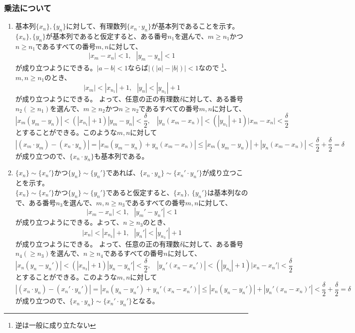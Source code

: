 \documentclass{jsarticle}
\begin{document}
\subsubsection{乗法について}
\begin{enumerate}
\item
基本列$\{x_n\},\{y_n\}$に対して、有理数列$\{x_n\cdot y_n\}$が基本列であることを示す。\\
$\{x_n\},\{y_n\}$が基本列であると仮定すると、ある番号$n_1$を選んで、$m\geq n_1$かつ$n\geq n_1$であるすべての番号$m,n$に対して、
\[|x_m-x_n|<1,\ \ \ |y_m-y_n|<1\]
が成り立つようにできる。$|a-b|<1$ならば$|(|a|-|b|)|<1$なので \footnote{逆は一般に成り立たない}、$m,n\geq n_1$のとき、
\[ |x_m|<|x_{n_1}|+1,\ \ \    |y_n|<|y_{n_1}|+1\]
が成り立つようにできる。
よって、任意の正の有理数$\delta$に対して、ある番号$n_2(\geq n_1)$を選んで、$m\geq n_2$かつ$n\geq n_2$であるすべての番号$m,n$に対して、
\[|x_m(y_m -y_n)| < (|x_{n_1}|+1)|y_m -y_n|<\frac{\delta}{2},\ \ \ \  |y_n(x_m-x_n)|<(|y_{n_1}|+1)|x_m-x_n|<\frac{\delta}{2}\]
とすることができる。このような$m,n$に対して
\[|(x_m\cdot y_m)-(x_n\cdot y_n)|=|x_m(y_m-y_n)+y_n(x_m-x_n)|\leq |x_m(y_m-y_n)|+|y_n(x_m-x_n)| < \frac{\delta}{2}+\frac{\delta}{2}=\delta\]
が成り立つので、$\{x_n\cdot y_n\}$も基本列である。

\item
$\{x_n\}\sim\{x_n'\}$かつ$\{y_n\}\sim\{y_n'\}$であれば、$\{x_n\cdot y_n\}\sim\{x_n'\cdot y_n'\}$が成り立つことを示す。\\
$\{x_n\}\sim\{x_n'\}$かつ$\{y_n\}\sim\{y_n'\}$であると仮定すると、$\{x_n\},\ \{y_n'\}$は基本列なので、ある番号$n_3$を選んで、$m,n\geq n_3$であるすべての番号$m,n$に対して、
\[|x_m-x_n|<1,\ \ \ |y_m'-y_n'|<1\]
が成り立つようにできる。よって、$n\geq n_3$のとき、
\[ |x_n|<|x_{n_3}|+1,\ \ \    |y_n'|<|y_{n_3}'|+1\]
が成り立つようにできる。
よって、任意の正の有理数$\delta$に対して、ある番号$n_4(\geq n_3)$を選んで、$n\geq n_4$であるすべての番号$n$に対して、
\[|x_n(y_n -y_n')| < (|x_{n_3}|+1)|y_n -y_n'|<\frac{\delta}{2},\ \ \ \  |y_n'(x_n-x_n')|<(|y_{n_3}|+1)|x_n-x_n'|<\frac{\delta}{2}\]
とすることができる。このような$m,n$に対して
\[|(x_n\cdot y_n)-(x_n'\cdot y_n')|=|x_n(y_n-y_n')+y_n'(x_n-x_n')|\leq |x_n(y_n-y_n')|+|y_n'(x_n-x_n)'| < \frac{\delta}{2}+\frac{\delta}{2}=\delta\]
が成り立つので、$\{x_n\cdot y_n\}\sim\{x_n'\cdot y_n'\}$となる。

\end{enumerate}

\end{document}
